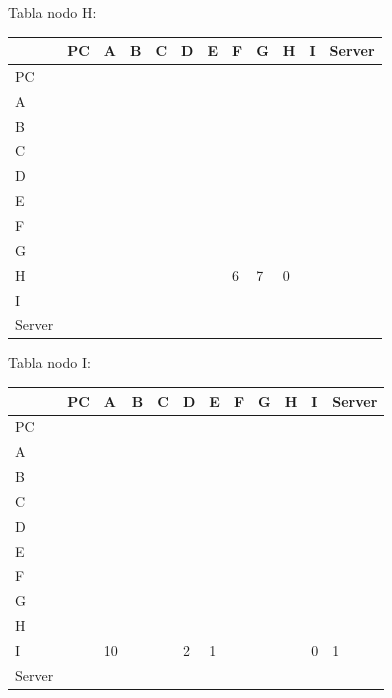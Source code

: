 \documentclass[a4paper]{article}
\begin{document}
\begin{table}[ht]
Tabla nodo H:\\
\begin{tabular}{|l|l|l|l|l|l|l|l|l|l|l|l|}
\hline
       & PC & A & B & C & D & E & F & G & H & I & Server \\ \hline
PC     &    &   &   &   &   &   &   &   &   &   &        \\ \hline
A      &    &   &   &   &   &   &   &   &   &   &        \\ \hline
B      &    &   &   &   &   &   &   &   &   &   &        \\ \hline
C      &    &   &   &   &   &   &   &   &   &   &        \\ \hline
D      &    &   &   &   &   &   &   &   &   &   &        \\ \hline
E      &    &   &   &   &   &   &   &   &   &   &        \\ \hline
F      &    &   &   &   &   &   &   &   &   &   &        \\ \hline
G      &    &   &   &   &   &   &   &   &   &   &        \\ \hline
H      &    &   &   &   &   &   & 6 & 7 & 0 &   &        \\ \hline
I      &    &   &   &   &   &   &   &   &   &   &        \\ \hline
Server &    &   &   &   &   &   &   &   &   &   &        \\ \hline
\end{tabular}
\end{table}

\begin{table}[ht]
Tabla nodo I:\\
\begin{tabular}{|l|l|l|l|l|l|l|l|l|l|l|l|}
\hline
       & PC & A  & B & C & D & E & F & G & H & I & Server \\ \hline
PC     &    &    &   &   &   &   &   &   &   &   &        \\ \hline
A      &    &    &   &   &   &   &   &   &   &   &        \\ \hline
B      &    &    &   &   &   &   &   &   &   &   &        \\ \hline
C      &    &    &   &   &   &   &   &   &   &   &        \\ \hline
D      &    &    &   &   &   &   &   &   &   &   &        \\ \hline
E      &    &    &   &   &   &   &   &   &   &   &        \\ \hline
F      &    &    &   &   &   &   &   &   &   &   &        \\ \hline
G      &    &    &   &   &   &   &   &   &   &   &        \\ \hline
H      &    &    &   &   &   &   &   &   &   &   &        \\ \hline
I      &    & 10 &   &   & 2 & 1 &   &   &   & 0 & 1      \\ \hline
Server &    &    &   &   &   &   &   &   &   &   &        \\ \hline
\end{tabular}
\end{table}
\end{document}
